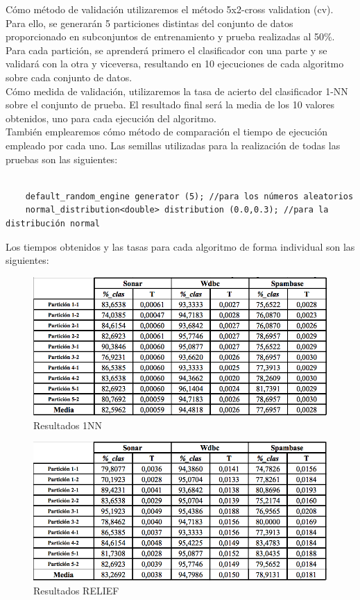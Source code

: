 Cómo método de validación utilizaremos el método 5x2-cross validation (cv). Para ello, se generarán 5 particiones distintas del conjunto de datos proporcionado en subconjuntos de entrenamiento y prueba realizadas al 50\%. Para cada partición, se aprenderá primero el clasificador con una parte y se validará con la otra y viceversa, resultando en 10 ejecuciones de cada algoritmo sobre cada conjunto de datos.\\ 

Cómo medida de validación, utilizaremos la tasa de acierto del clasificador 1-NN sobre el conjunto de prueba. El resultado final será la media de los 10 valores obtenidos, uno para cada ejecución del algoritmo.\\ 

También emplearemos cómo método de comparación el tiempo de ejecución empleado por cada uno.
Las semillas utilizadas para la realización de todas las pruebas son las siguientes:
\begin{verbatim}
	
	default_random_engine generator (5); //para los números aleatorios
	normal_distribution<double> distribution (0.0,0.3); //para la distribución normal
\end{verbatim} 
Los tiempos obtenidos y las tasas para cada algoritmo de forma individual son las siguientes:

\begin{figure}[H]
	\centering
	\caption{Resultados 1NN} \label{fig: Resultados 1NN}
	\includegraphics[scale=0.55]{1NN.png}  
	
\end{figure}

\begin{figure}[H]
	\centering
	\caption{Resultados RELIEF} \label{fig: Resultados RELIEF}
	\includegraphics[scale=0.55]{RELIEF.png}  
	
\end{figure}

